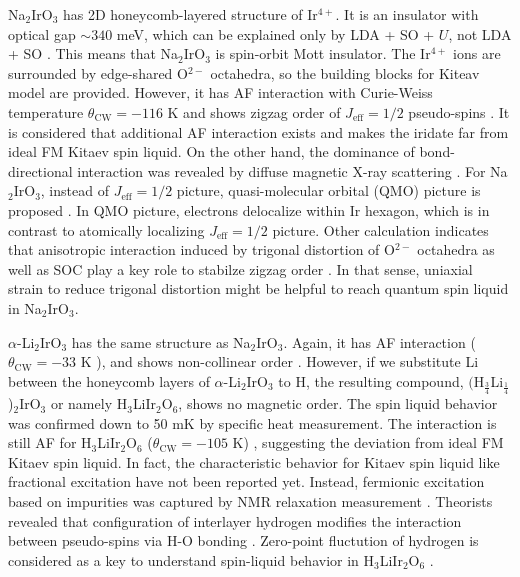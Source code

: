 Na$_2$IrO$_3$ has 2D honeycomb-layered structure of Ir$^{4+}$.
It is an insulator with optical gap $\sim 340$ meV, which can be explained only by LDA + SO + $U$, not LDA + SO \cite{comin20122}.
This means that Na$_2$IrO$_3$ is spin-orbit Mott insulator.
The Ir$^{4+}$ ions are surrounded by edge-shared O$^{2-}$ octahedra, so the building blocks for Kiteav model are provided.
However, it has AF interaction with Curie-Weiss temperature $\theta_{\mathrm{CW}} = - 116$ K \cite{singh2010antiferromagnetic}
and shows zigzag order of $J_{\mathrm{eff}} = 1/2$ pseudo-spins \cite{ye2012direct}.
It is considered that additional AF interaction exists and makes the iridate far from ideal FM Kitaev spin liquid.
On the other hand, the dominance of bond-directional interaction was revealed by diffuse magnetic X-ray scattering \cite{chun2015direct}.
For Na$_2$IrO$_3$, instead of $J_{\mathrm{eff}} = 1/2$ picture, quasi-molecular orbital (QMO) picture is proposed \cite{mazin20122}.
In QMO picture, electrons delocalize within Ir hexagon, which is in contrast to atomically localizing $J_{\mathrm{eff}} = 1/2$ picture.
Other calculation indicates that anisotropic interaction induced by trigonal distortion of O$^{2-}$ octahedra as well as SOC play a key role to stabilze zigzag order
\cite{yamaji2014first}.
In that sense, uniaxial strain to reduce trigonal distortion might be helpful to reach quantum spin liquid in Na$_2$IrO$_3$.


$\alpha$-Li$_2$IrO$_3$ has the same structure as Na$_2$IrO$_3$.
Again, it has AF interaction ($\theta_{\mathrm{CW}} = - 33$ K \cite{singh2012relevance}),
and shows non-collinear order \cite{williams2016incommensurate}.
However, if we substitute Li between the honeycomb layers of $\alpha$-Li$_2$IrO$_3$ to H,
the resulting compound, $($H$_{\frac{3}{4}}$Li$_{\frac{1}{4}}$)$_2$IrO$_3$
or namely H$_3$LiIr$_2$O$_6$, shows no magnetic order.
The spin liquid behavior was confirmed down to 50 mK by specific heat measurement.
The interaction is still AF for H$_3$LiIr$_2$O$_6$ ($\theta_{\mathrm{CW}} = -105$ K) \cite{kitagawa2018spin}, suggesting the deviation from ideal FM Kitaev spin liquid.
In fact, the characteristic behavior for Kitaev spin liquid like fractional excitation have not been reported yet.
Instead, fermionic excitation based on impurities was captured by NMR relaxation measurement \cite{kitagawa2018spin}.
Theorists revealed that configuration of interlayer hydrogen modifies the interaction between pseudo-spins via H-O bonding \cite{li2018role}.
Zero-point fluctution of hydrogen is considered as a key to understand spin-liquid behavior in H$_3$LiIr$_2$O$_6$ \cite{li2018role}.

